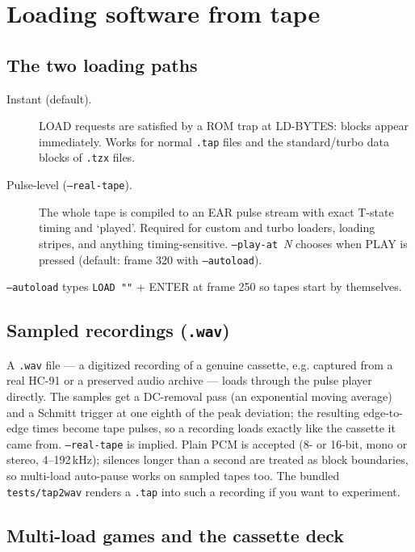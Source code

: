 \documentclass[11pt,a4paper]{article}
\newcommand{\opt}[1]{\texttt{#1}}
\begin{document}
\section{Loading software from tape}

\subsection{The two loading paths}

\begin{description}
\item[Instant (default).] LOAD requests are satisfied by a ROM trap at
LD-BYTES: blocks appear immediately. Works for normal \texttt{.tap}
files and the standard/turbo data blocks of \texttt{.tzx} files.
\item[Pulse-level (\opt{--real-tape}).] The whole tape is compiled to
an EAR pulse stream with exact T-state timing and `played'. Required
for custom and turbo loaders, loading stripes, and anything
timing-sensitive. \opt{--play-at}~\textit{N} chooses when PLAY is
pressed (default: frame 320 with \opt{--autoload}).
\end{description}

\opt{--autoload} types \texttt{LOAD ""} + ENTER at frame 250 so tapes
start by themselves.

\subsection{Sampled recordings (\texttt{.wav})}

A \texttt{.wav} file --- a digitized recording of a genuine cassette,
e.g. captured from a real HC-91 or a preserved audio archive --- loads
through the pulse player directly. The samples get a DC-removal pass
(an exponential moving average) and a Schmitt trigger at one eighth of
the peak deviation; the resulting edge-to-edge times become tape
pulses, so a recording loads exactly like the cassette it came from.
\opt{--real-tape} is implied. Plain PCM is accepted (8- or 16-bit,
mono or stereo, 4--192\,kHz); silences longer than a second are
treated as block boundaries, so multi-load auto-pause works on sampled
tapes too. The bundled \texttt{tests/tap2wav} renders a \texttt{.tap}
into such a recording if you want to experiment.

\subsection{Multi-load games and the cassette deck}
\label{sec:multiload}
\end{document}
